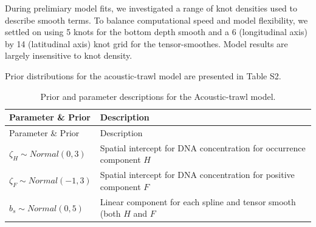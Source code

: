 \documentclass[
]{article}
\begin{document}
During prelimiary model fits, we investigated a range of knot densities
used to describe smooth terms. To balance computational speed and model
flexibility, we settled on using 5 knots for the bottom depth smooth and
a 6 (longitudinal axis) by 14 (latitudinal axis) knot grid for the
tensor-smoothes. Model results are largely insensitive to knot density.

Prior distributions for the acoustic-trawl model are presented in Table
S2.

\begin{longtable}[]{@{}ll@{}}
\caption{Prior and parameter descriptions for the Acoustic-trawl
model.}\tabularnewline
\toprule
\begin{minipage}[b]{0.47\columnwidth}\raggedright
Parameter \& Prior\strut
\end{minipage} & \begin{minipage}[b]{0.47\columnwidth}\raggedright
Description\strut
\end{minipage}\tabularnewline
\midrule
\endfirsthead
\toprule
\begin{minipage}[b]{0.47\columnwidth}\raggedright
Parameter \& Prior\strut
\end{minipage} & \begin{minipage}[b]{0.47\columnwidth}\raggedright
Description\strut
\end{minipage}\tabularnewline
\midrule
\endhead
\begin{minipage}[t]{0.47\columnwidth}\raggedright
\(\zeta_H \sim Normal(0,3)\)\strut
\end{minipage} & \begin{minipage}[t]{0.47\columnwidth}\raggedright
Spatial intercept for DNA concentration for occurrence component
\(H\)\strut
\end{minipage}\tabularnewline
\begin{minipage}[t]{0.47\columnwidth}\raggedright
\(\zeta_F \sim Normal(-1,3)\)\strut
\end{minipage} & \begin{minipage}[t]{0.47\columnwidth}\raggedright
Spatial intercept for DNA concentration for positive component
\(F\)\strut
\end{minipage}\tabularnewline
\begin{minipage}[t]{0.47\columnwidth}\raggedright
\(b_s \sim Normal(0,5)\)\strut
\end{minipage} & \begin{minipage}[t]{0.47\columnwidth}\raggedright
Linear component for each spline and tensor smooth (both \(H\) and \(F\)

\end{minipage}
\end{longtable}
\end{document}
